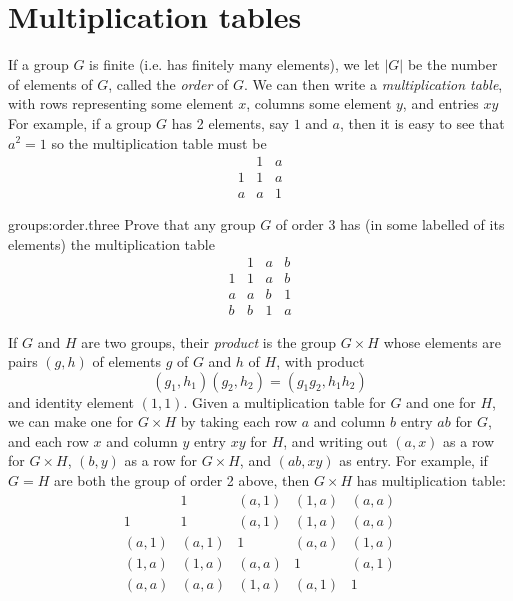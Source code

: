 \section{Multiplication tables}

If a group \(G\) is finite (i.e. has finitely many elements), we let \(|G|\) be the number of elements of \(G\), called the \emph{order} of \(G\).
We can then write a \emph{multiplication table}, with rows representing some element \(x\), columns some element \(y\), and entries \(xy\)
For example, if a group \(G\) has 2 elements, say \(1\) and \(a\), then it is easy to see that \(a^2=1\) so the multiplication table must be
\[
\begin{array}{c|cc}
  &  1 & a \\ \hline
1 &  1 & a \\
a &  a & 1
\end{array}
\]

\begin{problem}{groups:order.three}
Prove that any group \(G\) of order 3 has (in some labelled of its elements) the multiplication table
\[
\begin{array}{c|ccc}
  &  1 & a & b \\ \hline
1 &  1 & a & b \\
a &  a & b & 1 \\
b &  b & 1 & a
\end{array}
\]
\end{problem}

If \(G\) and \(H\) are two groups, their \emph{product} is the group \(G \times H\) whose elements are pairs \((g,h)\) of elements \(g\) of \(G\) and \(h\) of \(H\), with product
\[
(g_1,h_1)(g_2,h_2)=(g_1g_2,h_1h_2)
\]
and identity element \((1,1)\).
Given a multiplication table for \(G\) and one for \(H\), we can make one for \(G \times H\) by taking each row \(a\) and column \(b\) entry \(ab\) for \(G\), and each row \(x\) and column \(y\) entry \(xy\) for \(H\), and writing out \((a,x)\) as a row for \(G \times H\), \((b,y)\) as a row for \(G \times H\), and \((ab,xy)\) as entry.
For example, if \(G=H\) are both the group of order 2 above, then \(G \times H\) has multiplication table:
\[
\begin{array}{c|cccc}
      &     1 & (a,1) & (1,a) & (a,a) \\ \hline
    1 &     1 & (a,1) & (1,a) & (a,a) \\
(a,1) & (a,1) &     1 & (a,a) & (1,a) \\
(1,a) & (1,a) & (a,a) &     1 & (a,1) \\
(a,a) & (a,a) & (1,a) & (a,1) &     1
\end{array}
\]

